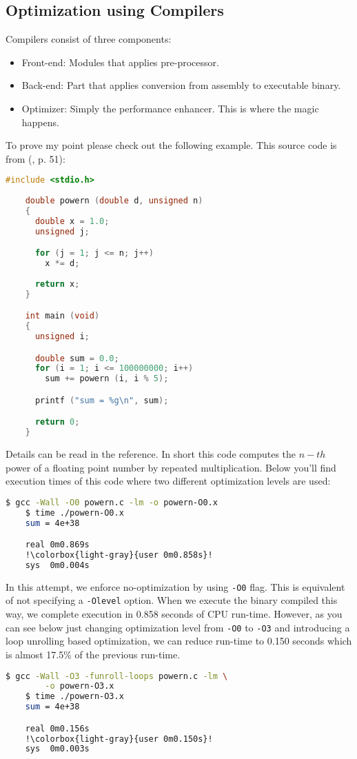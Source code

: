 \subsection{Optimization using Compilers}
Compilers consist of three components:
\begin{itemize}
  \item Front-end: Modules that applies pre-processor.
  \item Back-end: Part that applies conversion from assembly to executable binary.
  \item Optimizer: Simply the performance enhancer. This is where the magic happens.
\end{itemize}
To prove my point please check out the following example. This source code is from
(\cite{gough2004}, p. 51):
\begin{lstlisting}[language=C]
    #include <stdio.h>
      
    double powern (double d, unsigned n)
    {
      double x = 1.0;
      unsigned j;

      for (j = 1; j <= n; j++)
        x *= d;
  
      return x; 
    }

    int main (void)
    {
      unsigned i;

      double sum = 0.0;
      for (i = 1; i <= 100000000; i++)
        sum += powern (i, i % 5);

      printf ("sum = %g\n", sum);

      return 0; 
    }
\end{lstlisting}
Details can be read in the reference. In short this code computes the $n-th$ power of a 
floating point number by repeated multiplication. Below you'll find execution times
of this code where two different optimization levels are used:
\begin{lstlisting}[language=bash, escapechar=!]
    $ gcc -Wall -O0 powern.c -lm -o powern-O0.x
    $ time ./powern-O0.x 
    sum = 4e+38

    real 0m0.869s
    !\colorbox{light-gray}{user 0m0.858s}!
    sys	 0m0.004s
\end{lstlisting}
In this attempt, we enforce no-optimization by using \texttt{-O0} flag. This is equivalent 
of not specifying a \texttt{-Olevel} option. When we execute the binary compiled this way, 
we complete execution in 0.858 seconds of CPU run-time. However, as you can see below just
changing optimization level from \texttt{-O0} to \texttt{-O3} and introducing a loop unrolling
based optimization, we can reduce run-time to 0.150 seconds which is almost 17.5\% of the 
previous run-time. 
\begin{lstlisting}[language=bash, escapechar=!]
    $ gcc -Wall -O3 -funroll-loops powern.c -lm \
        -o powern-O3.x
    $ time ./powern-O3.x 
    sum = 4e+38

    real 0m0.156s
    !\colorbox{light-gray}{user 0m0.150s}!
    sys	 0m0.003s
\end{lstlisting}

